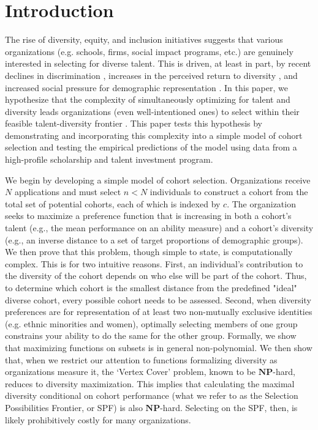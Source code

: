 \section{Introduction}\label{sec:introduction}
The rise of diversity, equity, and inclusion initiatives suggests that various organizations (e.g. schools, firms, social impact programs, etc.) are genuinely interested in selecting for diverse talent. This is driven, at least in part, by recent declines in discrimination \cite{hsieh2019allocation}, increases in the perceived return to diversity \cite{deming2017growing, page2019diversity, noray2023systemic}, and increased social pressure for demographic representation \cite{minkin2023diversity}. In this paper, we hypothesize that the complexity of simultaneously optimizing for talent and diversity leads organizations (even well-intentioned ones) to select within their feasible talent-diversity frontier \cite{nemhauser1978analysis, huppenkothen2020entrofy}. This paper tests this hypothesis by demonstrating and incorporating this complexity into a simple model of cohort selection and testing the empirical predictions of the model using data from a high-profile scholarship and talent investment program. 

We begin by developing a simple model of cohort selection. Organizations receive $N$ applications and must select $n<N$ individuals to construct a cohort from the total set of potential cohorts, each of which is indexed by $c$. The organization seeks to maximize a preference function that is increasing in both a cohort's talent (e.g., the mean performance on an ability measure) and a cohort's diversity (e.g., an inverse distance to a set of target proportions of demographic groups). We then prove that this problem, though simple to state, is computationally complex. This is for two intuitive reasons. First, an individual's contribution to the diversity of the cohort depends on who else will be part of the cohort. Thus, to determine which cohort is the smallest distance from the predefined "ideal" diverse cohort, every possible cohort needs to be assessed. Second, when diversity preferences are for representation of at least two non-mutually exclusive identities (e.g. ethnic minorities and women), optimally selecting members of one group constrains your ability to do the same for the other group. Formally, we show that maximizing functions on subsets is in general non-polynomial. We then show that, when we restrict our attention to functions formalizing diversity as organizations measure it, the `Vertex Cover' problem, known to be $\mathbf{NP}$-hard, reduces to diversity maximization. This implies that calculating the maximal diversity conditional on cohort performance (what we refer to as the Selection Possibilities Frontier, or SPF) is also $\mathbf{NP}$-hard. Selecting on the SPF, then, is likely prohibitively costly for many organizations. 

